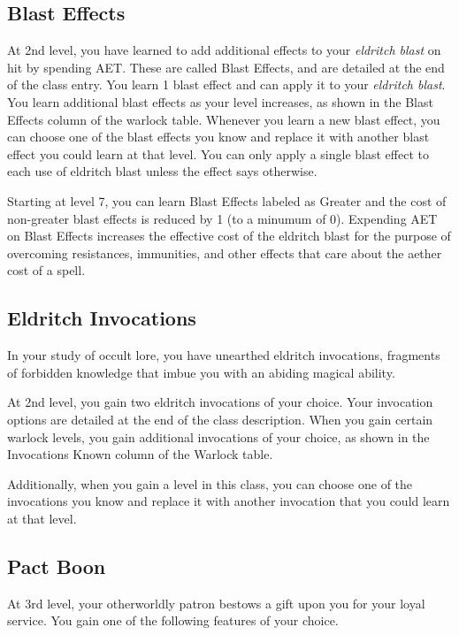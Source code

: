 \subsection{Blast Effects}

At 2nd level, you have learned to add additional effects to your \textit{eldritch blast} on hit by spending AET. These are called Blast Effects, and are detailed at the end of the class entry. You learn 1 blast effect and can apply it to your \textit{eldritch blast}. You learn additional blast effects as your level increases, as shown in the Blast Effects column of the warlock table. Whenever you learn a new blast effect, you can choose one of the blast effects you know and replace it with another blast effect you could learn at that level. You can only apply a single blast effect to each use of eldritch blast unless the effect says otherwise.

Starting at level 7, you can learn Blast Effects labeled as Greater and the cost of non-greater blast effects is reduced by 1 (to a minumum of 0). Expending AET on Blast Effects increases the effective cost of the eldritch blast for the purpose of overcoming resistances, immunities, and other effects that care about the aether cost of a spell.

\subsection{Eldritch Invocations}

In your study of occult lore, you have unearthed eldritch invocations, fragments of forbidden knowledge that imbue you with an abiding magical ability.

At 2nd level, you gain two eldritch invocations of your choice. Your invocation options are detailed at the end of the class description. When you gain certain warlock levels, you gain additional invocations of your choice, as shown in the Invocations Known column of the Warlock table.

Additionally, when you gain a level in this class, you can choose one of the invocations you know and replace it with another invocation that you could learn at that level.

\subsection{Pact Boon}

At 3rd level, your otherworldly patron bestows a gift upon you for your loyal service. You gain one of the following features of your choice.

